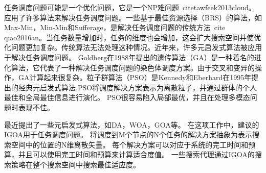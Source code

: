 任务调度问题可能是一个优化问题，它是一个NP难问题\ cite{tawfeek2013cloud}。应用了许多算法来解决任务调度问题。一些基于最佳资源选择（BRS）的算法，如Max-Min，Min-Min和Sufferage，是解决任务调度问题的传统方法\ cite {qiao2016an}。当任务数量增加时，任务的维度也会增加，这会扩大搜索空间并使优化问题更加复杂。传统算法无法处理这种情况。近年来，许多元启发式算法被应用于解决任务调度问题。 Goldberg在1988年提出的遗传算法（GA）是一种着名的进化算法，它代表了一种解决任务调度问题的染色体调度方案。由于交叉和变异的操作，GA计算起来很复杂。粒子群算法（PSO）是Kennedy和Eberhard在1995年提出的经典元启发式算法.PSO将调度解决方案表示为离散粒子，并通过群体的个人最佳和全局最佳信息进行演化。 PSO很容易陷入局部最优，并且在处理多模态问题时表现不佳。

最近提出了一些元启发式算法，如DA，WOA，GOA等。 在这项工作中，建议的IGOA用于任务调度问题。 将调度到M个节点的N个任务的解决方案抽象为表示搜索空间中的位置的N维离散矢量。 每个解决方案可以对应于系统的完工时间和预算，并且可以使用完工时间和预算来计算适合度值。 一些搜索代理通过IGOA的搜索策略在整个搜索空间中搜索最佳适应度。

